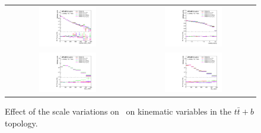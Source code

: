 \begin{figure}[p]
\begin{center}
\begin{tabular}{cc}
\includegraphics[width=0.48\textwidth]{Modeling/Figures/scales_tt1bq_q1_pt_norm} &
\includegraphics[width=0.48\textwidth]{Modeling/Figures/scales_tt1bq_q1_eta_norm} \\
\includegraphics[width=0.48\textwidth]{Modeling/Figures/scales_tt1bq_top_pt_norm} &
\includegraphics[width=0.48\textwidth]{Modeling/Figures/scales_tt1bq_ttbar_pt_norm} \\
\end{tabular}
\caption{Effect of the scale variations on \ShOL\ on kinematic variables in the $t\bar{t}+b$ topology.}
\label{fig:scales_tt1b}
\end{center}
\end{figure}
